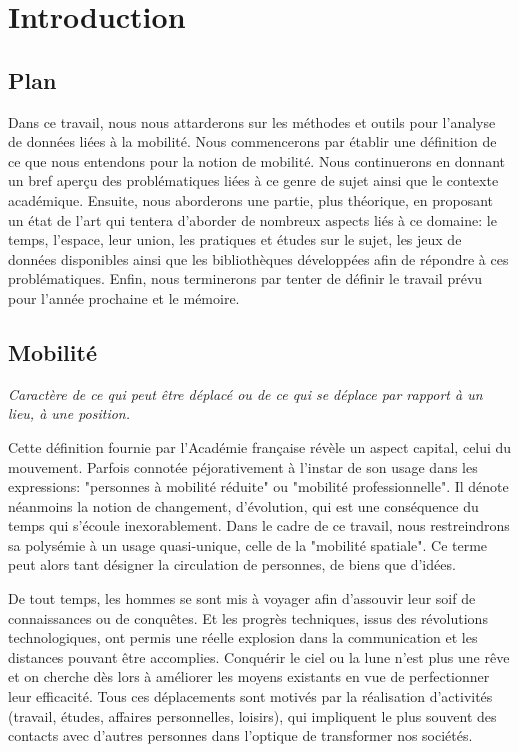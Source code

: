 \chapter{Introduction}

\section{Plan}

Dans ce travail, nous nous attarderons sur les méthodes et outils pour l'analyse de données liées à la mobilité. Nous commencerons par établir une définition de ce que nous entendons pour la notion de mobilité. Nous continuerons en donnant un bref aperçu des problématiques liées à ce genre de sujet ainsi que le contexte académique. Ensuite, nous aborderons une partie, plus théorique, en proposant un état de l'art qui tentera d'aborder de nombreux aspects liés à ce domaine: le temps, l'espace, leur union, les pratiques et études sur le sujet, les jeux de données disponibles ainsi que les bibliothèques développées afin de répondre à ces problématiques. Enfin, nous terminerons par tenter de définir le travail prévu pour l'année prochaine et le mémoire.

\section{Mobilité}

\begin{displayquote}
\textit{Caractère de ce qui peut être déplacé ou de ce qui se déplace par rapport à un lieu, à une position.}
\end{displayquote}
\vspace{3.5pt}

Cette définition fournie par l'Académie française révèle un aspect capital, celui du mouvement. Parfois connotée péjorativement à l'instar de son usage dans les expressions: "personnes à mobilité réduite" ou "mobilité professionnelle". Il dénote néanmoins la notion de changement, d'évolution, qui est une conséquence du temps qui s'écoule inexorablement. Dans le cadre de ce travail, nous restreindrons sa polysémie à un usage quasi-unique, celle de la "mobilité spatiale". Ce terme peut alors tant désigner la circulation de personnes, de biens que d'idées.

De tout temps, les hommes se sont mis à voyager afin d'assouvir leur soif de connaissances ou de conquêtes. Et les progrès techniques, issus des révolutions technologiques, ont permis une réelle explosion dans la communication et les distances pouvant être accomplies. Conquérir le ciel ou la lune n'est plus une rêve et on cherche dès lors à améliorer les moyens existants en vue de perfectionner leur efficacité. Tous ces déplacements sont motivés par la réalisation d'activités (travail, études, affaires personnelles, loisirs), qui impliquent le plus souvent des contacts avec d'autres personnes dans l'optique de transformer nos sociétés.

